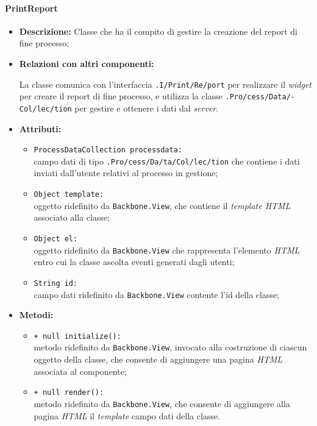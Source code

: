 \paragraph{PrintReport}
\label{printReport}
\begin{flushleft}
\begin{itemize}
\item \textbf{Descrizione:} Classe che ha il compito di gestire la creazione del report di fine processo;
\item \textbf{Relazioni con altri componenti:}
\begin{sloppypar}
La classe comunica con l'interfaccia \texttt{\viewUser{}.I\fshyp{}Print\fshyp{}Re\fshyp{}port} per realizzare il \textit{widget} per creare il report di fine processo, e utilizza la classe \texttt{\collection{}.Pro\fshyp{}cess\fshyp{}Data\fshyp{}Col\fshyp{}lec\fshyp{}tion} per gestire e ottenere i dati dal \textit{server}.
\end{sloppypar}
\item \textbf{Attributi:}
\begin{sloppypar}
\begin{itemize}
\item \texttt{ProcessDataCollection processdata:}\\ campo dati di tipo \texttt{\collection{}.Pro\fshyp{}cess\fshyp{}Da\fshyp{}ta\fshyp{}Col\fshyp{}lec\fshyp{}tion} che contiene i dati inviati dall'utente relativi al processo in gestione;
\item \texttt{Object template:}\\ oggetto ridefinito da \texttt{Backbone.View}, che contiene il \textit{template HTML} associato alla classe;
\item \texttt{Object el:}\\ oggetto ridefinito da \texttt{Backbone.View} che rappresenta l'elemento \textit{HTML} entro cui la classe ascolta eventi generati dagli utenti;
\item \texttt{String id:}\\ campo dati ridefinito da \texttt{Backbone.View} contente l'id della classe;
\end{itemize}
\end{sloppypar}
\item \textbf{Metodi:}
\begin{sloppypar}
\begin{itemize}
\item \texttt{+ null initialize():}\\ metodo ridefinito da \texttt{Backbone.View}, invocato alla costruzione di ciascun oggetto della classe, che consente di aggiungere una pagina \textit{HTML} associata al componente;
\item \texttt{+ null render():}\\ metodo ridefinito da \texttt{Backbone.View}, che consente di aggiungere alla pagina \textit{HTML} il \textit{template} campo dati della classe.
\end{itemize}
\end{sloppypar}
\end{itemize}
\end{flushleft}

